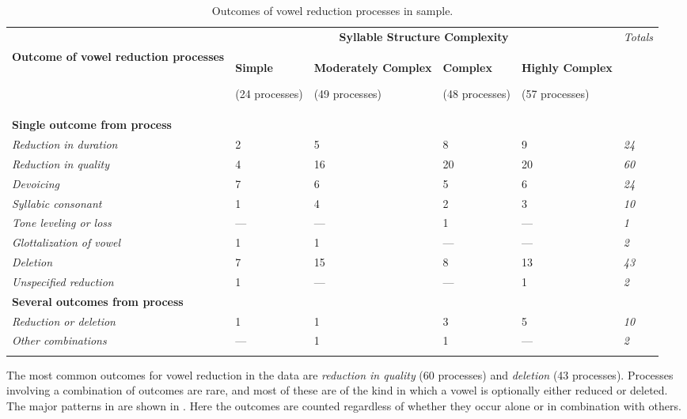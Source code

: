 \begin{table}
\begin{tabularx}{\textwidth}{XXXXXX}
\lsptoprule
 & \multicolumn{4}{c}{ \textbf{Syllable Structure Complexity}} & \textit{Totals}\\
 \textbf{Outcome of vowel reduction processes} & { \textbf{Simple}}

 (24 processes) & { \textbf{Moderately Complex}}

 (49 processes) & { \textbf{Complex}}

 (48 processes) & { \textbf{Highly Complex}}

 (57 processes) & \\
 \textbf{Single outcome from process} & \multicolumn{5}{c}{}\\
 \textit{Reduction in duration} & 2 & 5 & 8 & 9 & \textit{24}\\
 \textit{Reduction in quality} & 4 & 16 & 20 & 20 & \textit{60}\\
 \textit{Devoicing} & 7 & 6 & 5 & 6 & \textit{24}\\
 \textit{Syllabic consonant} & 1 & 4 & 2 & 3 & \textit{10}\\
 \textit{Tone leveling or loss} & — & — & 1 & — & \textit{1}\\
 \textit{Glottalization of vowel} & 1 & 1 & — & — & \textit{2}\\
 \textit{Deletion} & 7 & 15 & 8 & 13 & \textit{43}\\
 \textit{Unspecified reduction} & 1 & — & — & 1 & \textit{2}\\
 \textbf{Several outcomes from process} & \multicolumn{5}{c}{}\\
 \textit{Reduction or deletion} & 1 & 1 & 3 & 5 & \textit{10}\\
 \textit{Other combinations} & — & 1 & 1 & — & \textit{2}\\
\lspbottomrule
\end{tabularx}
\caption{\label{tab:6.8}Outcomes of vowel reduction processes in sample.}
\end{table}

  The most common outcomes for vowel reduction in the data are \textit{reduction in quality} (60 processes) and \textit{deletion} (43 processes). Processes involving a combination of outcomes are rare, and most of these are of the kind in which a vowel is optionally either reduced or deleted. The major patterns in  are shown in . Here the outcomes are counted regardless of whether they occur alone or in combination with others.


